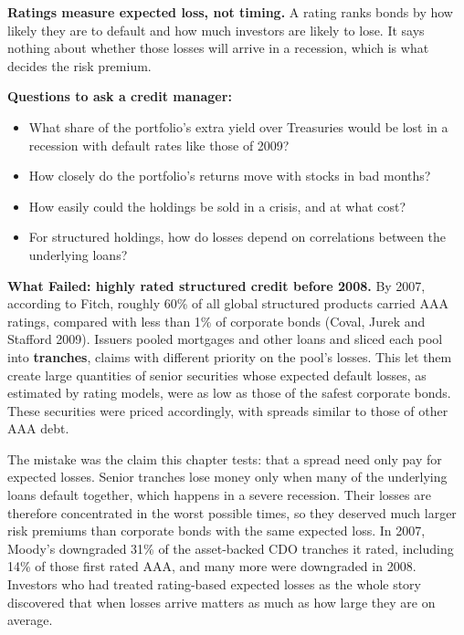 \textbf{Ratings measure expected loss, not timing.} A rating ranks bonds by how likely they are to default and how much investors are likely to lose. It says nothing about whether those losses will arrive in a recession, which is what decides the risk premium.

\textbf{Questions to ask a credit manager:}

\begin{itemize}
  \item What share of the portfolio's extra yield over Treasuries would be lost in a recession with default rates like those of 2009?
  \item How closely do the portfolio's returns move with stocks in bad months?
  \item How easily could the holdings be sold in a crisis, and at what cost?
  \item For structured holdings, how do losses depend on correlations between the underlying loans?
\end{itemize}

\begin{callout}
\textbf{What Failed: highly rated structured credit before 2008.} By 2007, according to Fitch, roughly 60\% of all global structured products carried AAA ratings, compared with less than 1\% of corporate bonds (Coval, Jurek and Stafford 2009). Issuers pooled mortgages and other loans and sliced each pool into \textbf{tranches}, claims with different priority on the pool's losses. This let them create large quantities of senior securities whose expected default losses, as estimated by rating models, were as low as those of the safest corporate bonds. These securities were priced accordingly, with spreads similar to those of other AAA debt.

The mistake was the claim this chapter tests: that a spread need only pay for expected losses. Senior tranches lose money only when many of the underlying loans default together, which happens in a severe recession. Their losses are therefore concentrated in the worst possible times, so they deserved much larger risk premiums than corporate bonds with the same expected loss. In 2007, Moody's downgraded 31\% of the asset-backed CDO tranches it rated, including 14\% of those first rated AAA, and many more were downgraded in 2008. Investors who had treated rating-based expected losses as the whole story discovered that when losses arrive matters as much as how large they are on average.
\end{callout}

